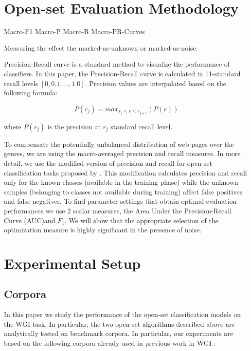 \documentclass[runningheads]{llncs}
\begin{document}
\section{Open-set Evaluation Methodology}

Macro-F1
Macro-P
Macro-R
Macro-PR-Curves

Measuring the effect the marked-as-unknown or marked-as-noise.


Precision-Recall curve is a standard method to visualize the performance of classifiers. In this paper, the Precision-Recall curve is calculated in 11-standard recall levels $[0,0.1,...,1.0]$. Precision values are interpolated based on the following formula:

\begin{equation}
	P(r_j)=max_{r_j \leqslant r \leqslant r_{j+1}}(P(r))
\end{equation}

\noindent
where $P(r_j)$ is the precision at $r_j$ standard recall level.

To compensate the potentially unbalanced distribution of web pages over the genres, we are using the macro-averaged precision and recall measures. In more detail, we use the modified version of precision and recall for open-set classification tasks proposed by \citep{mendesjunior2016}. This modification calculates precision and recall only for the known classes (available in the training phase) while the unknown samples (belonging to classes not available during training) affect false positives and false negatives. To find parameter settings that obtain optimal evaluation performances we use 2 scalar measures, the Area Under the Precision-Recall Curve (AUC)and $F_{1}$. We will show that the appropriate selection of the optimization measure is highly significant in the presence of noise.

\section{Experimental Setup}\label{sec:experimental_setup}
\subsection{Corpora}\label{sec:corpora}
In this paper we study the performance of the open-set classification models on the WGI task. In particular, the two open-set algorithms described above are analytically tested on benchmark corpora. In particular, our experiments are based on the following corpora already used in previous work in WGI \citep{meyer2004genre,santini2007automatic,kanaris2009learning}:
\end{document}
